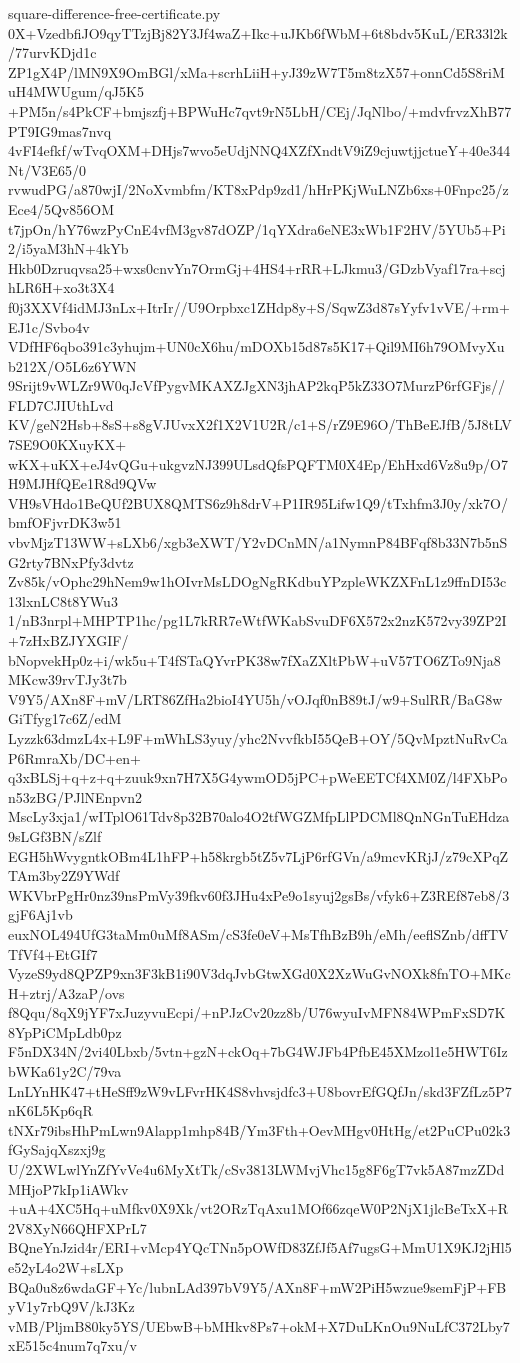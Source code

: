 \documentclass[11pt]{article}
\theoremstyle{definition}
\theoremstyle{remark}
\begin{document}
\begin{filecontents*}[overwrite]{square-difference-free-certificate.py}
0X+VzedbfiJO9qyTTzjBj82Y3Jf4waZ+Ikc+uJKb6fWbM+6t8bdv5KuL/ER33l2k/77urvKDjd1c
ZP1gX4P/lMN9X9OmBGl/xMa+scrhLiiH+yJ39zW7T5m8tzX57+onnCd5S8riMuH4MWUgum/qJ5K5
+PM5n/s4PkCF+bmjszfj+BPWuHc7qvt9rN5LbH/CEj/JqNlbo/+mdvfrvzXhB77PT9IG9mas7nvq
4vFI4efkf/wTvqOXM+DHjs7wvo5eUdjNNQ4XZfXndtV9iZ9cjuwtjjctueY+40e344Nt/V3E65/0
rvwudPG/a870wjI/2NoXvmbfm/KT8xPdp9zd1/hHrPKjWuLNZb6xs+0Fnpc25/zEce4/5Qv856OM
t7jpOn/hY76wzPyCnE4vfM3gv87dOZP/1qYXdra6eNE3xWb1F2HV/5YUb5+Pi2/i5yaM3hN+4kYb
Hkb0Dzruqvsa25+wxs0cnvYn7OrmGj+4HS4+rRR+LJkmu3/GDzbVyaf17ra+scjhLR6H+xo3t3X4
f0j3XXVf4idMJ3nLx+ItrIr//U9Orpbxc1ZHdp8y+S/SqwZ3d87sYyfv1vVE/+rm+EJ1c/Svbo4v
VDfHF6qbo391c3yhujm+UN0cX6hu/mDOXb15d87s5K17+Qil9MI6h79OMvyXub212X/O5L6z6YWN
9Srijt9vWLZr9W0qJcVfPygvMKAXZJgXN3jhAP2kqP5kZ33O7MurzP6rfGFjs//FLD7CJIUthLvd
KV/geN2Hsb+8sS+s8gVJUvxX2f1X2V1U2R/c1+S/rZ9E96O/ThBeEJfB/5J8tLV7SE9O0KXuyKX+
wKX+uKX+eJ4vQGu+ukgvzNJ399ULsdQfsPQFTM0X4Ep/EhHxd6Vz8u9p/O7H9MJHfQEe1R8d9QVw
VH9sVHdo1BeQUf2BUX8QMTS6z9h8drV+P1IR95Lifw1Q9/tTxhfm3J0y/xk7O/bmfOFjvrDK3w51
vbvMjzT13WW+sLXb6/xgb3eXWT/Y2vDCnMN/a1NymnP84BFqf8b33N7b5nSG2rty7BNxPfy3dvtz
Zv85k/vOphc29hNem9w1hOIvrMsLDOgNgRKdbuYPzpleWKZXFnL1z9ffnDI53c13lxnLC8t8YWu3
1/nB3nrpl+MHPTP1hc/pg1L7kRR7eWtfWKabSvuDF6X572x2nzK572vy39ZP2I+7zHxBZJYXGIF/
bNopvekHp0z+i/wk5u+T4fSTaQYvrPK38w7fXaZXltPbW+uV57TO6ZTo9Nja8MKcw39rvTJy3t7b
V9Y5/AXn8F+mV/LRT86ZfHa2bioI4YU5h/vOJqf0nB89tJ/w9+SulRR/BaG8wGiTfyg17c6Z/edM
Lyzzk63dmzL4x+L9F+mWhLS3yuy/yhc2NvvfkbI55QeB+OY/5QvMpztNuRvCaP6RmraXb/DC+en+
q3xBLSj+q+z+q+zuuk9xn7H7X5G4ywmOD5jPC+pWeEETCf4XM0Z/l4FXbPon53zBG/PJlNEnpvn2
MscLy3xja1/wITplO61Tdv8p32B70alo4O2tfWGZMfpLlPDCMl8QnNGnTuEHdza9sLGf3BN/sZlf
EGH5hWvygntkOBm4L1hFP+h58krgb5tZ5v7LjP6rfGVn/a9mcvKRjJ/z79cXPqZTAm3by2Z9YWdf
WKVbrPgHr0nz39nsPmVy39fkv60f3JHu4xPe9o1syuj2gsBs/vfyk6+Z3REf87eb8/3gjF6Aj1vb
euxNOL494UfG3taMm0uMf8ASm/cS3fe0eV+MsTfhBzB9h/eMh/eeflSZnb/dffTVTfVf4+EtGIf7
VyzeS9yd8QPZP9xn3F3kB1i90V3dqJvbGtwXGd0X2XzWuGvNOXk8fnTO+MKcH+ztrj/A3zaP/ovs
f8Qqu/8qX9jYF7xJuzyvuEcpi/+nPJzCv20zz8b/U76wyuIvMFN84WPmFxSD7K8YpPiCMpLdb0pz
F5nDX34N/2vi40Lbxb/5vtn+gzN+ckOq+7bG4WJFb4PfbE45XMzol1e5HWT6IzbWKa61y2C/79va
LnLYnHK47+tHeSff9zW9vLFvrHK4S8vhvsjdfc3+U8bovrEfGQfJn/skd3FZfLz5P7nK6L5Kp6qR
tNXr79ibsHhPmLwn9Alapp1mhp84B/Ym3Fth+OevMHgv0HtHg/et2PuCPu02k3fGySajqXszxj9g
U/2XWLwlYnZfYvVe4u6MyXtTk/cSv3813LWMvjVhc15g8F6gT7vk5A87mzZDdMHjoP7kIp1iAWkv
+uA+4XC5Hq+uMfkv0X9Xk/vt2ORzTqAxu1MOf66zqeW0P2NjX1jlcBeTxX+R2V8XyN66QHFXPrL7
BQneYnJzid4r/ERI+vMcp4YQcTNn5pOWfD83ZfJf5Af7ugsG+MmU1X9KJ2jHl5e52yL4o2W+sLXp
BQa0u8z6wdaGF+Yc/lubnLAd397bV9Y5/AXn8F+mW2PiH5wzue9semFjP+FByV1y7rbQ9V/kJ3Kz
vMB/PljmB80ky5YS/UEbwB+bMHkv8Ps7+okM+X7DuLKnOu9NuLfC372Lby7xE515c4num7q7xu/v

\end{filecontents*}
\end{document}
